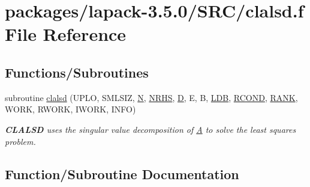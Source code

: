 \hypertarget{clalsd_8f}{}\section{packages/lapack-\/3.5.0/\+S\+R\+C/clalsd.f File Reference}
\label{clalsd_8f}
\subsection*{Functions/\+Subroutines}
\begin{DoxyCompactItemize}
\item 
subroutine \hyperlink{clalsd_8f_a26c9ab8dc8642c18e3cbde5769b8138d}{clalsd} (U\+P\+L\+O, S\+M\+L\+S\+I\+Z, \hyperlink{polmisc_8c_a0240ac851181b84ac374872dc5434ee4}{N}, \hyperlink{example__user_8c_aa0138da002ce2a90360df2f521eb3198}{N\+R\+H\+S}, \hyperlink{odrpack_8h_a7dae6ea403d00f3687f24a874e67d139}{D}, E, B, \hyperlink{example__user_8c_a50e90a7104df172b5a89a06c47fcca04}{L\+D\+B}, \hyperlink{superlu__enum__consts_8h_af00a42ecad444bbda75cde1b64bd7e72a9b5c151728d8512307565994c89919d5}{R\+C\+O\+N\+D}, \hyperlink{splinemodule_8c_a3a88bcc63386de30443dacede2e01847}{R\+A\+N\+K}, W\+O\+R\+K, R\+W\+O\+R\+K, I\+W\+O\+R\+K, I\+N\+F\+O)
\begin{DoxyCompactList}\small\item\em {\bfseries C\+L\+A\+L\+S\+D} uses the singular value decomposition of \hyperlink{classA}{A} to solve the least squares problem. \end{DoxyCompactList}\end{DoxyCompactItemize}


\subsection{Function/\+Subroutine Documentation}
\hypertarget{clalsd_8f_a26c9ab8dc8642c18e3cbde5769b8138d}{}

